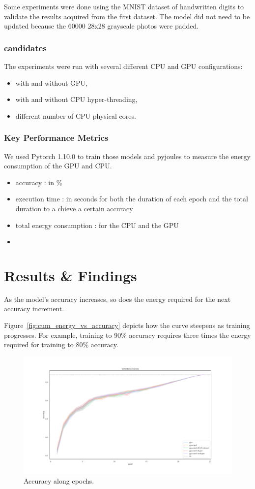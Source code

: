 Some experiments were done using the MNIST dataset of handwritten digits to validate the results acquired from the first dataset.
The model did not need to be updated because the 60000 28x28 grayscale photos were padded.


\subsubsection{candidates}
The experiments were run with several different CPU and GPU configurations:
\begin{itemize}
    \item with and without GPU,
    \item with and without CPU hyper-threading,
    \item different number of CPU physical cores.
\end{itemize}

\subsubsection{Key Performance Metrics}
We used Pytorch 1.10.0 to train those models and pyjoules to measure the energy consumption of the GPU and CPU.
\begin{itemize}
    \item accuracy : in \%
    \item execution time : in seconds for both the duration of each epoch and the total duration to a chieve a certain accuracy
    \item total energy consumption : for the CPU and the  GPU
    \item
\end{itemize}


\section{Results \& Findings}
As the model's accuracy increases, so does the energy required for the next accuracy increment.

Figure~\ref{fig:cum_energy_vs_accuracy} depicts how the curve steepens as training progresses.
For example, training to 90\% accuracy requires three times the energy required for training to 80\% accuracy.

\begin{figure}
    \centering
    \includegraphics[width=\linewidth]{imgs/accuracy_basedonepoch}
    \caption{Accuracy along epochs.}
    \label{fig:p2}
\end{figure}

